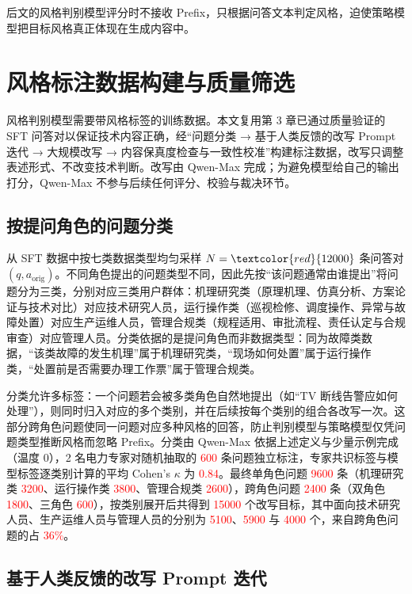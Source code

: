 \documentclass[fontset=fandol,type=master,campus=shenzhen,etitleauto=true]{hithesisbook}
\newcommand{\rev}[1]{\textcolor{red}{#1}}
\begin{document}
后文的风格判别模型评分时不接收 Prefix，只根据问答文本判定风格，迫使策略模型把目标风格真正体现在生成内容中。

\section{风格标注数据构建与质量筛选}\label{ux98ceux683cux504fux597dux6570ux636eux6784ux5efaux4e0e-llm-as-judge-ux7b5bux9009}

风格判别模型需要带风格标签的训练数据。本文复用第 3 章已通过质量验证的 SFT 问答对以保证技术内容正确，经“问题分类 → 基于人类反馈的改写 Prompt 迭代 → 大规模改写 → 内容保真度检查与一致性校准”构建标注数据，改写只调整表述形式、不改变技术判断。改写由 Qwen-Max 完成；为避免模型给自己的输出打分，Qwen-Max 不参与后续任何评分、校验与裁决环节。

\subsection{按提问角色的问题分类}\label{subsec:question-classify}

从 SFT 数据中按七类数据类型均匀采样 $N = \rev{12000}$ 条问答对 $(q, a_{\text{orig}})$。不同角色提出的问题类型不同，因此先按“该问题通常由谁提出”将问题分为三类，分别对应三类用户群体：机理研究类（原理机理、仿真分析、方案论证与技术对比）对应技术研究人员，运行操作类（巡视检修、调度操作、异常与故障处置）对应生产运维人员，管理合规类（规程适用、审批流程、责任认定与合规审查）对应管理人员。分类依据的是提问角色而非数据类型：同为故障类数据，“该类故障的发生机理”属于机理研究类，“现场如何处置”属于运行操作类，“处置前是否需要办理工作票”属于管理合规类。

分类允许多标签：一个问题若会被多类角色自然地提出（如“TV 断线告警应如何处理”），则同时归入对应的多个类别，并在后续按每个类别的组合各改写一次。这部分跨角色问题使同一问题对应多种风格的回答，防止判别模型与策略模型仅凭问题类型推断风格而忽略 Prefix。分类由 Qwen-Max 依据上述定义与少量示例完成（温度 0），2 名电力专家对随机抽取的 \rev{600} 条问题独立标注，专家共识标签与模型标签逐类别计算的平均 Cohen's $\kappa$ 为 \rev{0.84}。最终单角色问题 \rev{9600} 条（机理研究类 \rev{3200}、运行操作类 \rev{3800}、管理合规类 \rev{2600}），跨角色问题 \rev{2400} 条（双角色 \rev{1800}、三角色 \rev{600}），按类别展开后共得到 \rev{15000} 个改写目标，其中面向技术研究人员、生产运维人员与管理人员的分别为 \rev{5100}、\rev{5900} 与 \rev{4000} 个，来自跨角色问题的占 \rev{36\%}。

\subsection{基于人类反馈的改写 Prompt 迭代}\label{ux57faux4e8e-sft-ux6570ux636eux7684ux573aux666fux9002ux914dux6539ux5199}
\end{document}
